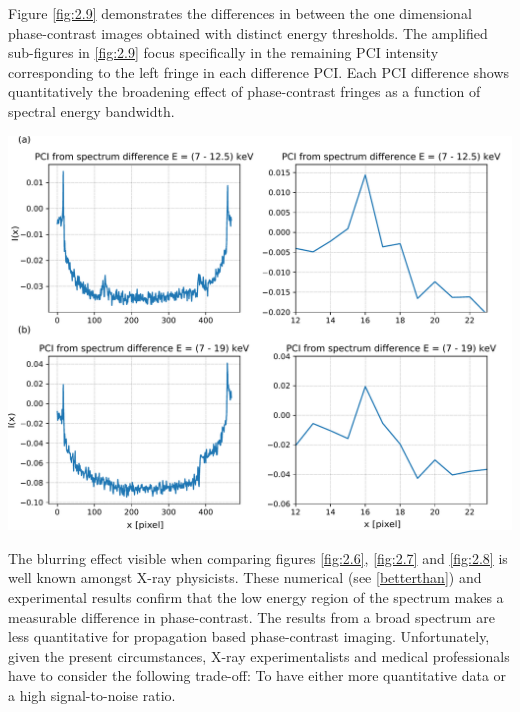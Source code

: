 \documentclass[10pt, a4paper, singlespacing]{report}
\newenvironment{Figure}
    {\par\medskip\noindent\minipage{\linewidth}}
    {\endminipage\par\medskip}
\begin{document}
Figure \ref{fig:2.9} demonstrates the differences in between the one dimensional phase-contrast images obtained with distinct energy thresholds. The amplified sub-figures in \ref{fig:2.9} focus specifically in the remaining PCI intensity corresponding to the left fringe in each difference PCI. Each PCI difference shows quantitatively the broadening effect of phase-contrast fringes as a function of spectral energy bandwidth.
\begin{Figure}
 \centering
 \includegraphics[width=\linewidth]{diff.pdf}
\label{fig:2.9}  
\end{Figure}
The blurring effect visible when comparing figures \ref{fig:2.6}, \ref{fig:2.7} and \ref{fig:2.8} is well known amongst X-ray physicists. These numerical (see \ref{betterthan}) and experimental results confirm that the low energy region of the spectrum makes a measurable difference in phase-contrast. The results from a broad spectrum are less quantitative for propagation based phase-contrast imaging. Unfortunately, given the present circumstances, X-ray experimentalists and medical professionals have to consider the following trade-off: To have either more quantitative data or a high signal-to-noise ratio.
\end{document}
